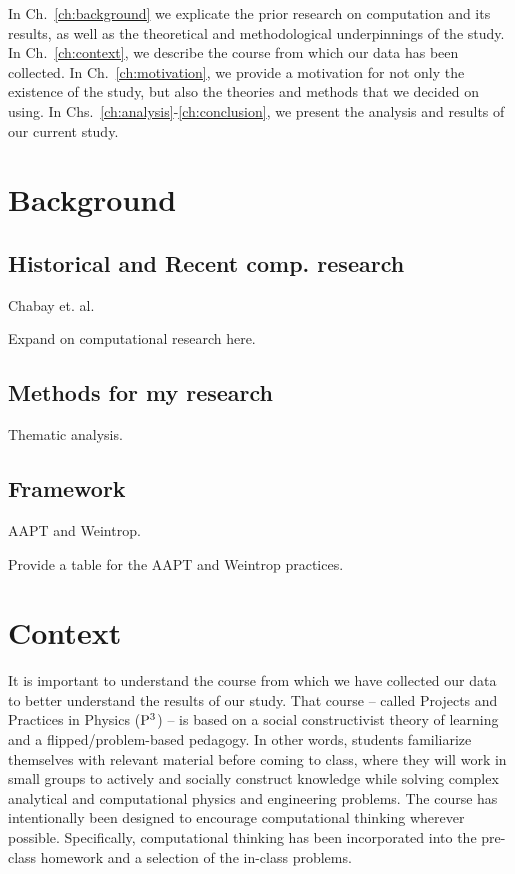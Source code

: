 \documentclass{msuphddissertation}
\begin{document}
\begin{doublespace}
In Ch.~\ref{ch:background} we explicate the prior research on computation and its results, as well as the theoretical and methodological underpinnings of the study.  In Ch.~\ref{ch:context}, we describe the course from which our data has been collected.  In Ch.~\ref{ch:motivation}, we provide a motivation for not only the existence of the study, but also the theories and methods that we decided on using.  In Chs.~\ref{ch:analysis}-\ref{ch:conclusion}, we present the analysis and results of our current study.

%
%

\chapter{Background} %

\section{Historical and Recent comp. research}

Chabay et. al.

Expand on computational research here.

\section{Methods for my research}

Thematic analysis.

\section{Framework}

AAPT and Weintrop.

Provide a table for the AAPT and Weintrop practices.

%
%
\chapter{Context}

It is important to understand the course from which we have collected our data to better understand the results of our study.  That course -- called Projects and Practices in Physics (${\rm P}^{3}$) -- is based on a social constructivist theory of learning and a flipped/problem-based pedagogy.  In other words, students familiarize themselves with relevant material before coming to class, where they will work in small groups to actively and socially construct knowledge while solving complex analytical and computational physics and engineering problems.  The course has intentionally been designed to encourage computational thinking wherever possible.  Specifically, computational thinking has been incorporated into the pre-class homework and a selection of the in-class problems.


\end{doublespace}
\end{document}
